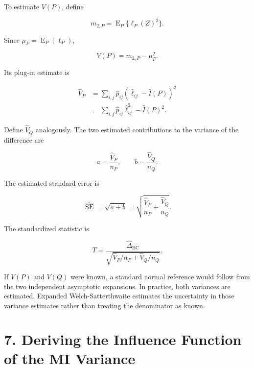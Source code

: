 \documentclass[
  11pt]{article}
\let\originalsection\section
\renewcommand{\section}{\clearpage\originalsection}
\begin{document}
To estimate \(V(P)\), define

\begin{equation}
m_{2,P}=\operatorname E_P\{\ell_P(Z)^2\}.
\end{equation}

Since \(\mu_P=\operatorname E_P(\ell_P)\),

\begin{equation}
V(P)=m_{2,P}-\mu_P^2.
\end{equation}

Its plug-in estimate is

\begin{equation}
\begin{aligned}
\widehat V_P
&=\sum_{i,j}\widehat p_{ij}
\left(\widehat\ell_{ij}-\widehat I(P)\right)^2\\
&=\sum_{i,j}\widehat p_{ij}\widehat\ell_{ij}^2
-\widehat I(P)^2.
\end{aligned}
\end{equation}

Define \(\widehat V_Q\) analogously. The two estimated contributions to
the variance of the difference are

\begin{equation}
a=\frac{\widehat V_P}{n_P},
\qquad
b=\frac{\widehat V_Q}{n_Q}.
\end{equation}

The estimated standard error is

\begin{equation}
\widehat{\operatorname{SE}}
=\sqrt{a+b}
=\sqrt{
\frac{\widehat V_P}{n_P}
+\frac{\widehat V_Q}{n_Q}
}.
\end{equation}

The standardized statistic is

\begin{equation}
\boxed{
T
=\frac{\widehat\Delta_{\mathrm{BC}}}
{\sqrt{\widehat V_P/n_P+\widehat V_Q/n_Q}}.
}
\end{equation}

If \(V(P)\) and \(V(Q)\) were known, a standard normal reference would
follow from the two independent asymptotic expansions. In practice, both
variances are estimated. Expanded Welch-Satterthwaite estimates the
uncertainty in those variance estimates rather than treating the
denominator as known.

\section{7. Deriving the Influence Function of the MI
Variance}\label{deriving-the-influence-function-of-the-mi-variance}
\end{document}
